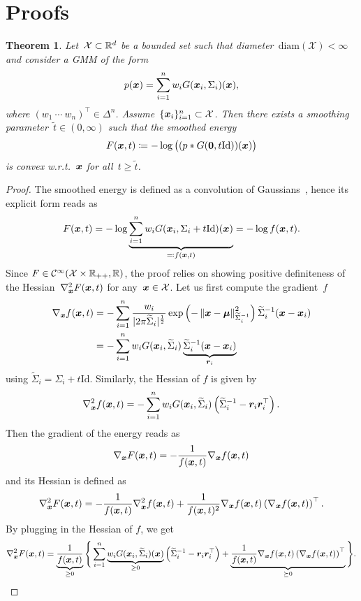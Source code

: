 \documentclass{article} %
\theoremstyle{plain}
\newtheorem{theorem}{Theorem}[section]
\theoremstyle{definition}
\theoremstyle{remark}
\newcommand{\C}{\mathcal{C}}
\newcommand{\X}{\mathcal{X}}
\newcommand{\id}{\mathrm{Id}}
\newcommand{\norm}[1]{\left\Vert#1\right\Vert}
\renewcommand{\vec}[1]{\mathbf{#1}}
\newcommand{\diameter}{\mathrm{diam}}
\begin{document}
\section{Proofs}

\begin{theorem}
Let~$\X\subset\R^d$ be a bounded set such that diameter~$\diameter(\X)<\infty$ and consider a GMM of the form
\[
p({\bm{x}}) = \sum_{i=1}^n w_i G({\bm{x}}_i,\Sigma_i)({\bm{x}}),
\]
where $(w_1\ \cdots \ w_n)^\top\in\Delta^n$. Assume~$\{\vx_i\}_{i=1}^n\subset\X$.
Then there exists a smoothing parameter~$\widetilde{t}\in(0,\infty)$ such that the smoothed energy
\[
F(\vx,t)\coloneqq -\log \big( (p \ast G(\vec{0}, t\id))(\vx)\big)
\]
is \emph{convex} w.r.t.~${\bm{x}}$ for all~$t\geq\widetilde{t}$.
\end{theorem}
\begin{proof}
The smoothed energy is defined as a convolution of Gaussians~\citep{Du19}, hence its explicit form reads as
\begin{align} \label{eq:fgmm}
F(\vx,t) = -\log \underbrace{\sum_{i=1}^n w_i G(\vx_i,\Sigma_i+t\id)(\vx)}_{\eqqcolon f(\vx,t)} = -\log f(\vx,t).
\end{align}
Since $F\in\C^{\infty}(\X\times \R_{++}, \R)$, the proof relies on showing positive definiteness of the Hessian~$\nabla_{\bm{x}}^2 F({\bm{x}},t)$ for any~$\vx\in\X$.
Let us first compute the gradient~$f$
\begin{align*}
\nabla_\vx f(\vx,t) &= 
-\sum_{i=1}^n \frac{w_i}{\vert 2\pi\widetilde{\Sigma}_i\vert^{\frac{1}{2}}} \exp\left(-\norm{\vx-\bm{\mu}}_{\widetilde{\Sigma}_i^{-1}}^2\right) \widetilde{\Sigma}_i^{-1} (\vx-\vx_i)\\
&= -\sum_{i=1}^n w_i G(\vx_i,\widetilde{\Sigma}_i) \underbrace{\widetilde{\Sigma}_i^{-1} (\vx-\vx_i)}_{\vr_i}
\end{align*}
using $\widetilde{\Sigma}_i = \Sigma_i+t\id$.
Similarly, the Hessian of $f$ is given by
\[
\nabla_{\bm{x}}^2 f({\bm{x}},t) = -\sum_{i=1}^n w_i G({\bm{x}}_i,\widetilde{\Sigma}_i)\left(\widetilde{\Sigma}_i^{-1} -  {\bm{r}}_i{\bm{r}}_i^\top\right).
\]
Then the gradient of the energy reads as
\[
\nabla_{\bm{x}} F({\bm{x}}, t) = -\frac{1}{f({\bm{x}},t)} \nabla_{\bm{x}} f({\bm{x}},t)
\]
and its Hessian is defined as
\[
\nabla_{\bm{x}}^2 F({\bm{x}}, t) =
-\frac{1}{f({\bm{x}},t)} \nabla_{\bm{x}}^2 f({\bm{x}}, t) + \frac{1}{f({\bm{x}},t)^2} \nabla_{\bm{x}} f({\bm{x}},t) \left(\nabla_{\bm{x}} f({\bm{x}},t)\right)^\top.
\]
By plugging in the Hessian of $f$, we get
\[
\nabla_{\bm{x}}^2 F({\bm{x}}, t) = \underbrace{\frac{1}{f({\bm{x}},t)}}_{\geq0}\Bigg\{\sum_{i=1}^n \underbrace{w_i G({\bm{x}}_i,\widetilde{\Sigma}_i)({\bm{x}})}_{\geq0} \left( \widetilde{\Sigma}_i^{-1} - {\bm{r}}_i{\bm{r}}_i^\top  \right) + \underbrace{\frac{1}{f({\bm{x}},t)} \nabla_{\bm{x}} f({\bm{x}},t) \left(\nabla_{\bm{x}} f({\bm{x}},t)\right)^\top}_{\succeq 0} \Bigg\}.
\]
\end{proof}
\end{document}
